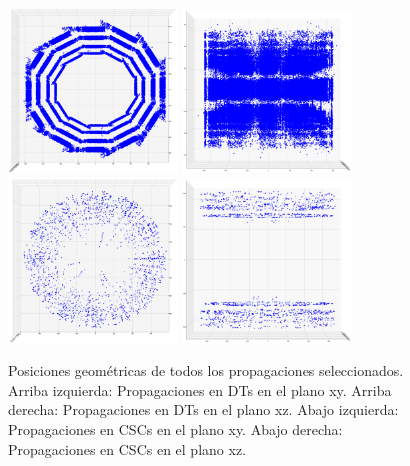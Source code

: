 \begin{figure}
\centering
\includegraphics[width=0.4\textwidth]{figures/Props_DT_xy_postCleaning.png}
\includegraphics[width=0.4\textwidth]{figures/Props_DT_xz_boarders.png}
\includegraphics[width=0.4\textwidth]{figures/Props_CSC_xy_boarders.png}
\includegraphics[width=0.4\textwidth]{figures/Props_CSC_xz_boarders.png}
\caption{Posiciones geom\'etricas de todos los propagaciones seleccionados. Arriba izquierda: Propagaciones en DTs en el plano xy. Arriba derecha: Propagaciones en DTs en el plano xz. Abajo izquierda: Propagaciones en CSCs en el plano xy. Abajo derecha: Propagaciones en CSCs en el plano xz.}
\label{fig:props_pos}
\end{figure}

